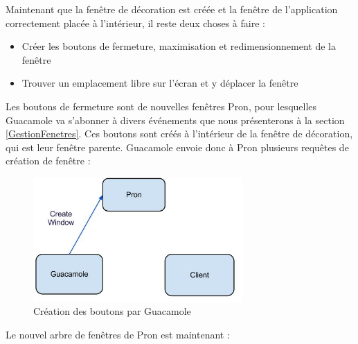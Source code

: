 \begin{center}
\end{center}

Maintenant que la fenêtre de décoration est créée et la fenêtre de l'application correctement placée à l'intérieur, il reste deux choses à faire :

\begin{itemize}
  \item Créer les boutons de fermeture, maximisation et redimensionnement de la fenêtre
  \item Trouver un emplacement libre sur l'écran et y déplacer la fenêtre
\end{itemize}

Les boutons de fermeture sont de nouvelles fenêtres Pron, pour lesquelles Guacamole va s'abonner à divers événements que nous présenterons à la section \ref{GestionFenetres}.
Ces boutons sont créés à l'intérieur de la fenêtre de décoration, qui est leur fenêtre parente.
Guacamole envoie donc à Pron plusieurs requêtes de création de fenêtre :

\begin{figure}[H]
  \centering
  \includegraphics[width=8cm]{images/Guacamole_anim_6.jpg}
  \caption{Création des boutons par Guacamole}
  \label{fig:guacamole_anim_6}
\end{figure}

Le nouvel arbre de fenêtres de Pron est maintenant :

\begin{center}
\end{center}

